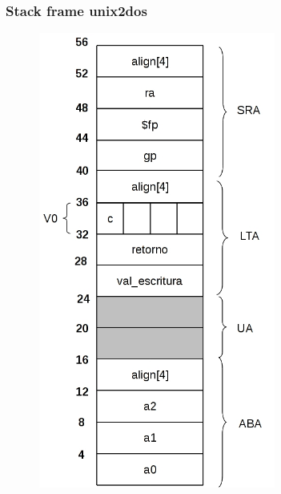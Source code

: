 \documentclass[a4paper,10pt]{article}
\begin{document}
    \subsubsection{Stack frame unix2dos}
      \begin{center}
	\includegraphics[width=10cm, height=15cm]{DibujosStackFrame/stack-conversor-unix2dos.jpg}
      \end{center}
\end{document}
